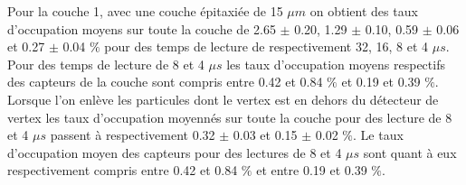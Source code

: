 
  Pour la couche 1, avec une couche \'epitaxi\'ee de 15 $\mu m$ on obtient des taux d'occupation moyens sur toute la couche de 2.65 $\pm$ 0.20, 1.29 $\pm$ 0.10, 0.59 $\pm$ 0.06 et 0.27 $\pm$ 0.04 $\%$ pour des temps de lecture de respectivement 32, 16, 8 et 4 $\mu s$. Pour des temps de lecture de 8 et 4 $\mu s$ les taux d'occupation moyens respectifs des capteurs de la couche sont compris entre 0.42 et 0.84 $\%$ et 0.19 et 0.39 $\%$. Lorsque l'on enl\`eve les particules dont le vertex est en dehors du d\'etecteur de vertex les taux d'occupation moyenn\'es sur toute la couche pour des lecture de 8 et 4 $\mu s$ passent \`a respectivement 0.32 $\pm$ 0.03 et 0.15 $\pm$ 0.02 $\%$. Le taux d'occupation moyen des capteurs pour des lectures de 8 et 4 $\mu s$ sont quant \`a eux respectivement compris entre 0.42 et 0.84 $\%$ et entre 0.19 et 0.39 $\%$. 
  
